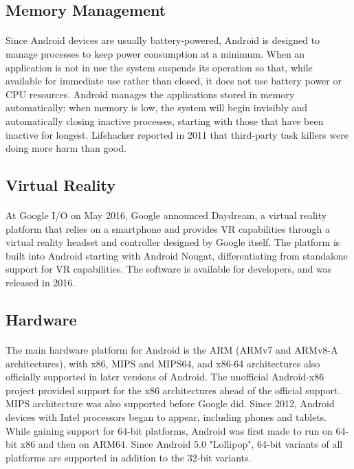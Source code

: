 \documentclass[a4paper,12pt]{report}
\begin{document}
\subsection{Memory Management}
\paragraph{}Since Android devices are usually battery-powered, Android is designed to manage processes to keep power consumption at a minimum. When an application is not in use the system suspends its operation so that, while available for immediate use rather than closed, it does not use battery power or CPU resources. Android manages the applications stored in memory automatically: when memory is low, the system will begin invisibly and automatically closing inactive processes, starting with those that have been inactive for longest. Lifehacker reported in 2011 that third-party task killers were doing more harm than good.
\subsection{Virtual Reality}
\paragraph{}At Google I/O on May 2016, Google announced Daydream, a virtual reality platform that relies on a smartphone and provides VR capabilities through a virtual reality headset and controller designed by Google itself. The platform is built into Android starting with Android Nougat, differentiating from standalone support for VR capabilities. The software is available for developers, and was released in 2016.
\subsection{Hardware}
\paragraph{}The main hardware platform for Android is the ARM (ARMv7 and ARMv8-A architectures), with x86, MIPS and MIPS64, and x86-64 architectures also officially supported in later versions of Android. The unofficial Android-x86 project provided support for the x86 architectures ahead of the official support. MIPS architecture was also supported before Google did. Since 2012, Android devices with Intel processors began to appear, including phones and tablets. While gaining support for 64-bit platforms, Android was first made to run on 64-bit x86 and then on ARM64. Since Android 5.0 "Lollipop", 64-bit variants of all platforms are supported in addition to the 32-bit variants.
\end{document}
